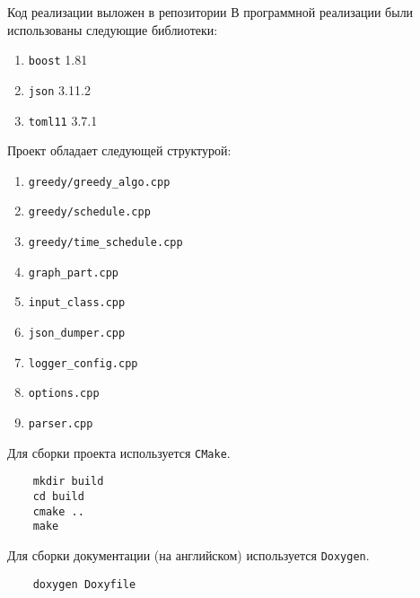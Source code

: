 Код реализации выложен в репозитории \cite{Repository}
В программной реализации были использованы следующие библиотеки:
\begin{enumerate}
    \item \texttt{boost} 1.81 \cite{boost_framework}
    \item \texttt{json} 3.11.2 \cite{json_lib}
    \item \texttt{toml11} 3.7.1 \cite{toml11_lib}
\end{enumerate}

Проект обладает следующей структурой:
\begin{enumerate}
    \item \texttt{greedy/greedy_algo.cpp}
    \item \texttt{greedy/schedule.cpp}
    \item \texttt{greedy/time_schedule.cpp}
    \item \texttt{graph_part.cpp}
    \item \texttt{input_class.cpp}
    \item \texttt{json_dumper.cpp}
    \item \texttt{logger_config.cpp}
    \item \texttt{options.cpp}
    \item \texttt{parser.cpp}
\end{enumerate}

Для сборки проекта используется \texttt{CMake}.
\begin{verbatim}
    mkdir build
    cd build
    cmake ..
    make
\end{verbatim}

Для сборки документации (на английском) используется \texttt{Doxygen}.
\begin{verbatim}
    doxygen Doxyfile
\end{verbatim}